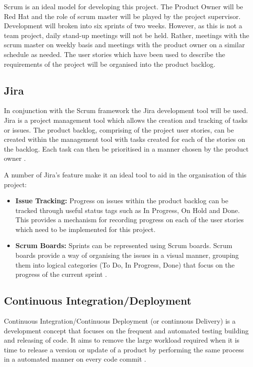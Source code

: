 	Scrum is an ideal model for developing this project. The Product Owner will be Red Hat and the role of scrum master will be played by the project supervisor. Development will broken into six sprints of two weeks. However, as this is not a team project, daily stand-up meetings will not be held. Rather, meetings with the scrum master on weekly basis and meetings with the product owner on a similar schedule as needed. The user stories which have been used to describe the requirements of the project will be organised into the product backlog.
	
	\subsection{Jira}
	In conjunction with the Scrum framework the Jira development tool will be used. Jira is a project management tool which allows the creation and tracking of tasks or issues. The product backlog, comprising of the project user stories, can be created within the management tool with tasks created for each of the stories on the backlog. Each task can then be prioritised in a manner chosen by the product owner \citep{jira}.
	
	A number of Jira's feature make it an ideal tool to aid in the organisation of this project:
	\begin{itemize}
		\item \textbf{Issue Tracking:} Progress on issues within the product backlog can be tracked through useful status tags such as In Progress, On Hold and Done. This provides a mechanism for recording progress on each of the user stories which need to be implemented for this project. 
		\item \textbf{Scrum Boards: } Sprints can be represented using Scrum boards. Scrum boards provide a way of organising the issues in a visual manner, grouping them into logical categories (To Do, In Progress, Done) that focus on the progress of the current sprint \cite{scruminc}.
	\end{itemize}

	\subsection{Continuous Integration/Deployment}
	Continuous Integration/Continuous Deployment (or continuous Delivery) is a development concept that focuses on the frequent and automated testing building and releasing of code. It aims to remove the large workload required when it is time to release a version or update of a product by performing the same process in a automated manner on every code commit \citep{pittet}.
	
